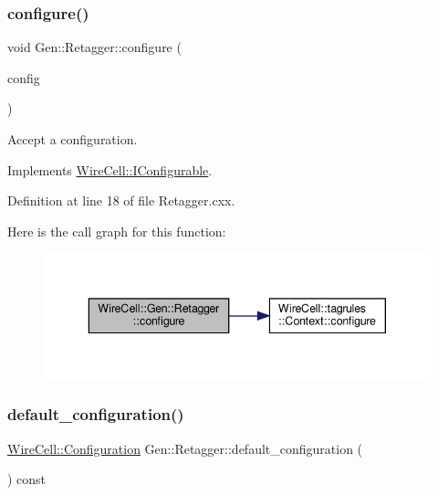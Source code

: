 \subsubsection{\texorpdfstring{configure()}{configure()}}
{\footnotesize\ttfamily void Gen\+::\+Retagger\+::configure (\begin{DoxyParamCaption}\item[{const \hyperlink{namespace_wire_cell_a9f705541fc1d46c608b3d32c182333ee}{Wire\+Cell\+::\+Configuration} \&}]{config }\end{DoxyParamCaption})\hspace{0.3cm}{\ttfamily [virtual]}}



Accept a configuration. 



Implements \hyperlink{class_wire_cell_1_1_i_configurable_a57ff687923a724093df3de59c6ff237d}{Wire\+Cell\+::\+I\+Configurable}.



Definition at line 18 of file Retagger.\+cxx.

Here is the call graph for this function\+:
\nopagebreak
\begin{figure}[H]
\begin{center}
\leavevmode
\includegraphics[width=343pt]{class_wire_cell_1_1_gen_1_1_retagger_a8c198fcdc40f6254b5a33475f6a8e5bc_cgraph}
\end{center}
\end{figure}
\mbox{\label{class_wire_cell_1_1_gen_1_1_retagger_a0fb8c413592ae2e5e169361384cce52a}} 
\subsubsection{\texorpdfstring{default\+\_\+configuration()}{default\_configuration()}}
{\footnotesize\ttfamily \hyperlink{namespace_wire_cell_a9f705541fc1d46c608b3d32c182333ee}{Wire\+Cell\+::\+Configuration} Gen\+::\+Retagger\+::default\+\_\+configuration (\begin{DoxyParamCaption}{ }\end{DoxyParamCaption}) const\hspace{0.3cm}{\ttfamily [virtual]}}




